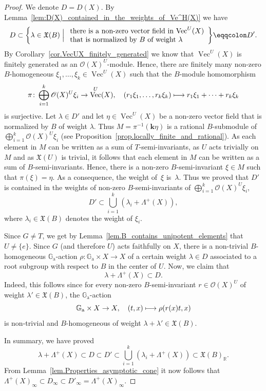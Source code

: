 \documentclass[JEP,XML,SOM,Unicode]{cedram}
\let\mathcal\mathscr
\def\mto{\mathchoice{\longmapsto}{\mapsto}{\mapsto}{\mapsto}}
\newcommand{\ra}{\mathrm{a}}
\theoremstyle{plain}
\theoremstyle{definition}
\DeclareMathOperator{\Ve}{Vec}
\newcommand{\OO}{\mathcal{O}}
\newcommand{\GG}{\mathbb{G}}
\newcommand{\RR}{\mathbb{R}}
\newcommand{\kk}{{\boldsymbol{k}}}
\newcommand{\Bigset}[2]{\biggl\{#1 \Bigm|  #2\biggr\}}
\begin{document}
\begin{proof}
We denote $D = D(X)$.
By Lemma~\ref{lem:D(X)_contained_in_the_weights_of_Ve^H(X)} we have
\[
D \subset
\Bigset{\lambda \in \mathfrak{X}(B)}
{
\begin{array}{l}
\textrm{there is a non-zero vector field in $\Ve^U(X)$} \\
\textrm{that is normalized by $B$ of weight $\lambda$}
\end{array}
} \eqqcolon D'.
\]
By Corollary~\ref{cor.VecUX_finitely_generated}
we know that $\Ve^U(X)$ is finitely generated as an $\OO(X)^U$-module.
Hence, there are finitely many non-zero $B$-homogeneous
$\xi_1, \ldots, \xi_k \in \Ve^U(X)$ such that the $B$-module homomorphism
\[
\pi \colon \bigoplus_{i=1}^k \OO(X)^U \xi_i \to \Ve^U(X), \quad
(r_1 \xi_1, \ldots, r_k \xi_k) \mto r_1 \xi_1 + \cdots + r_k \xi_k
\]
is surjective. Let $\lambda \in D'$ and let $\eta \in \Ve^U(X)$ be a non-zero vector field
that is normalized by $B$ of weight $\lambda$. Thus $M = \pi^{-1}(\kk \eta)$ is a rational
$B$-submodule of $\bigoplus_{i=1}^k \OO(X)^U \xi_i$ (see Proposition~\ref{prop.locally_finite_and_rational}).
As each element in $M$ can be written as a sum of $T$-semi-invariants, as $U$ acts trivially on $M$
and as $\mathfrak{X}(U)$ is trivial, it follows that each element in $M$ can be written as a sum
of $B$-semi-invariants. Hence, there is a non-zero $B$-semi-invariant $\xi \in M$ such that
$\pi(\xi) = \eta$. As a consequence, the weight of~$\xi$ is~$\lambda$. Thus we proved that $D'$
is contained in the weights of non-zero $B$-semi-invariants of $\bigoplus_{i=1}^k \OO(X)^U \xi_i$, \ie
\[
D' \subset \bigcup_{i=1}^k \left( \lambda_i + \Lambda^+(X) \right),
\]
where $\lambda_i \in \mathfrak{X}(B)$ denotes the weight of $\xi_i$.

Since $G \neq T$, we get by Lemma~\ref{lem.B_contains_unipotent_elements} that
$U \neq \{e\}$. Since $G$ (and therefore $U$) acts faithfully on $X$, there is a non-trivial
$B$-homogeneous
$\GG_\ra$-action $\rho \colon \GG_\ra \times X \to X$ of a certain weight $\lambda \in D$
associated to a root subgroup with respect to $B$ in the center of $U$.
Now, we claim that
\[
\lambda + \Lambda^+(X) \subset D.
\]
Indeed, this follows since for every non-zero $B$-semi-invariant $r \in \OO(X)^U$ of weight
$\lambda' \in \mathfrak{X}(B)$,
the $\GG_\ra$-action
\[
\GG_\ra \times X \to X, \quad (t, x) \mto \rho(r(x)t, x)
\]
is non-trivial and $B$-homogeneous of weight $\lambda + \lambda' \in \mathfrak{X}(B)$.

In summary, we have proved
\[
\lambda + \Lambda^+(X) \subset D \subset D' \subset \bigcup_{i=1}^k \left( \lambda_i + \Lambda^+(X) \right) \subset \mathfrak{X}(B)_{\RR}.
\]
From Lemma~\ref{lem.Properties_asymptotic_cone} it now follows that
$\Lambda^+(X)_{\infty} \subset D_{\infty} \subset D'_{\infty} = \Lambda^+(X)_{\infty}$.
\end{proof}
\end{document}
